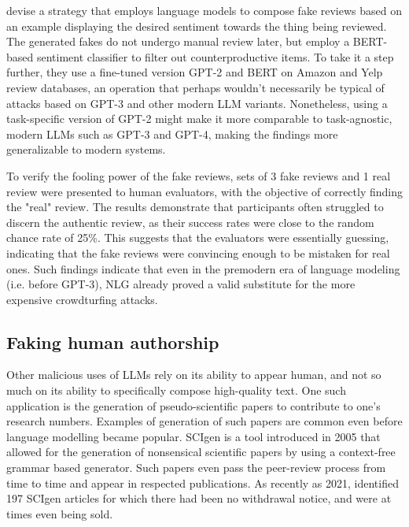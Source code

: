 \citet{adelani2019reviews} devise a strategy that employs language models to compose fake reviews based on an example displaying the desired sentiment towards the thing being reviewed.
The generated fakes do not undergo manual review later, but employ a BERT-based sentiment classifier to filter out counterproductive items.
To take it a step further, they use a fine-tuned version GPT-2 and BERT on Amazon and Yelp review databases, an operation that perhaps wouldn't necessarily be typical of attacks based on GPT-3 and other modern LLM variants.
Nonetheless, using a task-specific version of GPT-2 might make it more comparable to task-agnostic, modern LLMs such as GPT-3 and GPT-4, making the findings more generalizable to modern systems.

To verify the fooling power of the fake reviews, sets of 3 fake reviews and 1 real review were presented to human evaluators, with the objective of correctly finding the "real" review.
The results demonstrate that participants often struggled to discern the authentic review, as their success rates were close to the random chance rate of 25\%.
This suggests that the evaluators were essentially guessing, indicating that the fake reviews were convincing enough to be mistaken for real ones.
Such findings indicate that even in the premodern era of language modeling (i.e. before GPT-3), NLG already proved a valid substitute for the more expensive crowdturfing attacks.

\subsection{Faking human authorship}

Other malicious uses of LLMs rely on its ability to appear human, and not so much on its ability to specifically compose high-quality text.
One such application is the generation of pseudo-scientific papers to contribute to one's research numbers.
Examples of generation of such papers are common even before language modelling became popular.
SCIgen \citep{hargrave2005scigen} is a tool introduced in 2005 that allowed for the generation of nonsensical scientific papers by using a context-free grammar based generator.
Such papers even pass the peer-review process from time to time and appear in respected publications.
As recently as 2021, \citet{cabanac2021prevalence} identified 197 SCIgen articles for which there had been no withdrawal notice, and were at times even being sold.